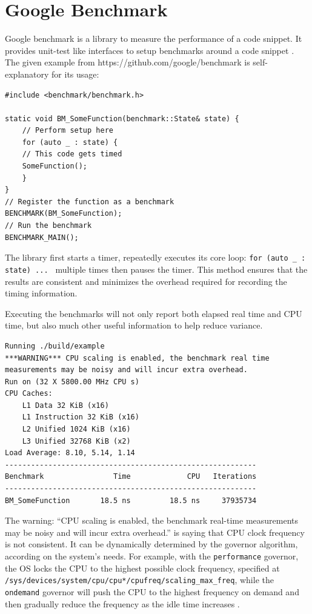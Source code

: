 \documentclass[logo,bsc,singlespacing,parskip]{infthesis}
\begin{document}
\section{Google Benchmark}
Google benchmark is a library to measure the performance of a code snippet. It
provides unit-test like interfaces to setup benchmarks around a code snippet
\cite{googlebench}. The given example from https://github.com/google/benchmark
is self-explanatory for its usage: 

\begin{verbatim}
#include <benchmark/benchmark.h>

static void BM_SomeFunction(benchmark::State& state) {
    // Perform setup here
    for (auto _ : state) {
    // This code gets timed
    SomeFunction();
    }
}
// Register the function as a benchmark
BENCHMARK(BM_SomeFunction);
// Run the benchmark
BENCHMARK_MAIN();
\end{verbatim}

The library first starts a timer, repeatedly executes its core loop: \texttt{for
(auto \_ : state) ... } multiple times then pauses the timer. This method
ensures that the results are consistent and minimizes the overhead required for
recording the timing information. 

Executing the benchmarks will not only report both elapsed real time and CPU
time, but also much other useful information to help reduce variance. 
\begin{verbatim}
Running ./build/example
***WARNING*** CPU scaling is enabled, the benchmark real time 
measurements may be noisy and will incur extra overhead.
Run on (32 X 5800.00 MHz CPU s)
CPU Caches:
    L1 Data 32 KiB (x16)
    L1 Instruction 32 KiB (x16)
    L2 Unified 1024 KiB (x16)
    L3 Unified 32768 KiB (x2)
Load Average: 8.10, 5.14, 1.14
----------------------------------------------------------
Benchmark                Time             CPU   Iterations
----------------------------------------------------------
BM_SomeFunction       18.5 ns         18.5 ns     37935734
\end{verbatim}

The warning: ``CPU scaling is enabled, the benchmark real-time measurements may
be noisy and will incur extra overhead.'' is saying that CPU clock frequency is
not consistent. It can be dynamically determined by the governor algorithm,
according on the system's needs. For example, with the \texttt{performance}
governor, the OS locks the CPU to the highest possible clock frequency,
specified at \texttt{/sys/devices/system/cpu/cpu*/cpufreq/scaling\_max\_freq},
while the \texttt{ondemand} governor will push the CPU to the highest frequency
on demand and then gradually reduce the frequency as the idle time increases
\cite{archLinuxFreqScal}.
\end{document}
